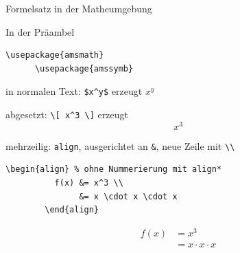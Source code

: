 \begin{Frame}[fragile]{Formelsatz in der Matheumgebung}
  \begin{Block}{In der Präambel}
    \begin{lstlisting}[gobble=6,style=block]
      \usepackage{amsmath}
      \usepackage{amssymb}
    \end{lstlisting}
  \end{Block}
  
  \begin{looseitemize}
    \item in normalen Text: \lstinline-$x^y$- erzeugt $x^y$
    \item abgesetzt: \lstinline-\[ x^3 \]- erzeugt
      \[ x^3 \]
    \item mehrzeilig: \lstinline-align-, ausgerichtet an \lstinline-&-, neue Zeile mit \lstinline-\\- 
      \begin{lstlisting}[gobble=8]
        \begin{align} % ohne Nummerierung mit align*
          f(x) &= x^3 \\
               &= x \cdot x \cdot x
        \end{align}
      \end{lstlisting}
      \begin{align}
        f(x) &= x^3 \\
             &= x \cdot x \cdot x
      \end{align}
  \end{looseitemize}
\end{Frame}

